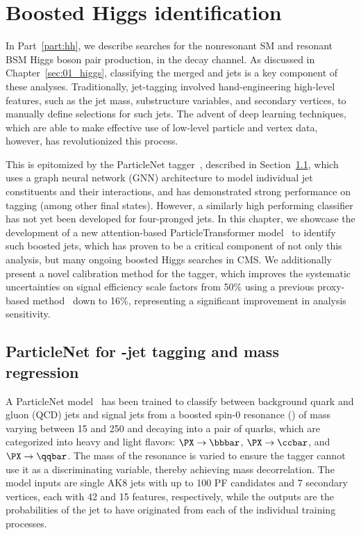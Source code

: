 \chapter{Boosted Higgs identification}
\label{sec:05_jet_tagging}

In Part~\ref{part:hh}, we describe searches for the nonresonant SM and resonant BSM Higgs boson pair production, in the \bbvvq decay channel.
As discussed in Chapter~\ref{sec:01_higgs}, classifying the merged \hbb and \hyvv jets is a key component of these analyses.
Traditionally, jet-tagging involved hand-engineering high-level features, such as the jet mass, substructure variables, and secondary vertices, to manually define selections for such jets.
The advent of deep learning techniques, which are able to make effective use of low-level particle and vertex data, however, has revolutionized this process.

This is epitomized by the ParticleNet tagger~\cite{Qu:2019gqs}, described in Section~\ref{sec:05_hbb_tagger}, which uses a graph neural network (GNN) architecture to model individual jet constituents and their interactions, and has demonstrated strong performance on \hbb tagging (among other final states).
However, a similarly high performing classifier has not yet been developed for four-pronged \VVq jets.
In this chapter, we showcase the development of a new attention-based ParticleTransformer model~\cite{Qu:2022mxj} to identify such boosted \hvvq jets, which has proven to be a critical component of not only this analysis, but many ongoing boosted Higgs searches in CMS.
We additionally present a novel calibration method for the \hyvv tagger, which improves the systematic uncertainties on signal efficiency scale factors from 50\% using a previous proxy-based method~\cite{CMS:2022lqh} down to 16\%, representing a significant improvement in analysis sensitivity.


\section{ParticleNet for \texorpdfstring{\bbbar}{bb}-jet tagging and mass regression}
\label{sec:05_hbb_tagger}

A ParticleNet model~\cite{CMS-DP-2020-002} has been trained to classify between background quark and gluon (QCD) jets and signal jets from a boosted spin-0 resonance (\PX) of mass varying between 15 and 250 \GeV and decaying into a pair of quarks, which are categorized into heavy and light flavors: $\PX\to\bbbar$, $\PX\to\ccbar$, and $\PX\to\qqbar$. 
The mass of the resonance is varied to ensure the tagger cannot use it as a discriminating variable, thereby achieving mass decorrelation.
The model inputs are single AK8 jets with up to 100 PF candidates and 7 secondary vertices, each with 42 and 15 features, respectively, while the outputs are the probabilities of the jet to have originated from each of the individual training processes.

